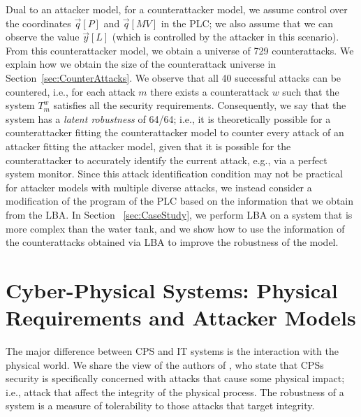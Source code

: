 Dual to an attacker model, for a counterattacker model, we assume control over the coordinates $\vec{q}[P]$ and $\vec{q}[MV]$ in the PLC; we also assume that we can observe the value $\vec{y}[L]$ (which is controlled by the attacker in this scenario). From this counterattacker model, we obtain a universe of 729 counterattacks. We explain how we obtain the size of the counterattack universe in Section~\ref{sec:CounterAttacks}. We observe that all 40 successful attacks can be countered, i.e., for each attack $m$ there exists a counterattack $w$ such that the system $T^w_m$ satisfies all the security requirements. Consequently, we say that the system has a \emph{latent robustness} of 64/64; i.e., it is theoretically possible for a counterattacker fitting the counterattacker model to counter every attack of an attacker fitting the attacker model, given that it is possible for the counterattacker to accurately identify the current attack, e.g., via a perfect system monitor. Since this attack identification condition may not be practical for attacker models with multiple diverse attacks, we instead consider a modification of the program of the PLC based on the information that we obtain from the LBA. In Section ~\ref{sec:CaseStudy}, we perform LBA on a system that is more complex than the water tank, and we show how to use the information of the counterattacks obtained via LBA to improve the robustness of the model. 
 
\section{Cyber-Physical Systems: Physical Requirements and Attacker Models}
The major difference between CPS and IT systems is the interaction with the physical world. We share the view of the authors of \cite{CPSSecVinyl}, who state that CPSs security is {specifically} concerned with attacks that cause some physical impact; i.e., attack that affect the integrity of the physical process. The robustness of a system is a measure of tolerability to those attacks that target integrity.

